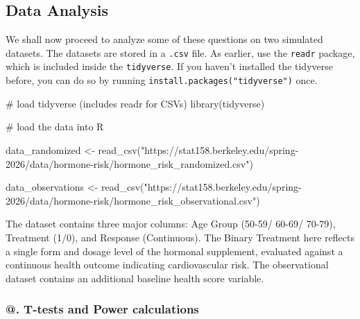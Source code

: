 \documentclass[
  letterpaper,
  DIV=11,
  numbers=noendperiod]{scrartcl}
\newenvironment{Shaded}{\begin{snugshade}}{\end{snugshade}}
\newcommand{\CommentTok}[1]{\textcolor[rgb]{0.37,0.37,0.37}{#1}}
\newcommand{\FunctionTok}[1]{\textcolor[rgb]{0.28,0.35,0.67}{#1}}
\newcommand{\NormalTok}[1]{\textcolor[rgb]{0.00,0.23,0.31}{#1}}
\newcommand{\OtherTok}[1]{\textcolor[rgb]{0.00,0.23,0.31}{#1}}
\newcommand{\StringTok}[1]{\textcolor[rgb]{0.13,0.47,0.30}{#1}}
\begin{document}
\hfill\break
\hfill\break
\hfill\break
\hfill\break
\hfill\break
\hfill\break
\hfill\break

\subsection{Data Analysis}\label{data-analysis}

We shall now proceed to analyze some of these questions on two simulated
datasets. The datasets are stored in a \texttt{.csv} file. As earlier,
use the \texttt{readr} package, which is included inside the
\texttt{tidyverse}. If you haven't installed the tidyverse before, you
can do so by running \texttt{install.packages("tidyverse")} once.

\begin{Shaded}
\begin{Highlighting}[]
\CommentTok{\# load tidyverse (includes readr for CSVs)}
\FunctionTok{library}\NormalTok{(tidyverse)}
\end{Highlighting}
\end{Shaded}

\begin{Shaded}
\begin{Highlighting}[]
\CommentTok{\# load the data into R}

\NormalTok{data\_randomized }\OtherTok{\textless{}{-}} \FunctionTok{read\_csv}\NormalTok{(}\StringTok{"https://stat158.berkeley.edu/spring{-}2026/data/hormone{-}risk/hormone\_risk\_randomized.csv"}\NormalTok{)}

\NormalTok{data\_observations }\OtherTok{\textless{}{-}} \FunctionTok{read\_csv}\NormalTok{(}\StringTok{"https://stat158.berkeley.edu/spring{-}2026/data/hormone{-}risk/hormone\_risk\_observational.csv"}\NormalTok{)}
\end{Highlighting}
\end{Shaded}

The dataset contains three major columns: Age Group (50-59/ 60-69/
70-79), Treatment (1/0), and Response (Continuous). The Binary Treatment
here reflects a single form and dosage level of the hormonal supplement,
evaluated against a continuous health outcome indicating cardiovascular
risk. The observational dataset contains an additional baseline health
score variable.

\subsubsection{@. T-tests and Power
calculations}\label{t-tests-and-power-calculations}
\end{document}
